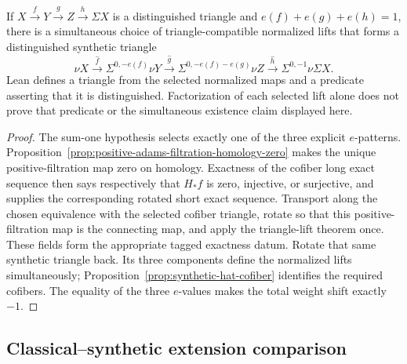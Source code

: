 \begin{proposition}
  \label{prop:normalized-synthetic-triangle}
  \notready
  If $X\xrightarrow fY\xrightarrow gZ\xrightarrow h\Sigma X$ is a
  distinguished triangle and $e(f)+e(g)+e(h)=1$, there is a simultaneous
  choice of triangle-compatible normalized lifts that forms a distinguished
  synthetic triangle
  \[
    \nu X\xrightarrow{\widehat f}\Sigma^{0,-e(f)}\nu Y
    \xrightarrow{\widehat g}\Sigma^{0,-e(f)-e(g)}\nu Z
    \xrightarrow{\widehat h}\Sigma^{0,-1}\nu\Sigma X.
  \]
  Lean defines a triangle from the selected normalized maps and a
  predicate asserting that it is distinguished. Factorization of each
  selected lift alone does not prove that predicate or the simultaneous
  existence claim displayed here.
\end{proposition}

\begin{proof}
  The sum-one hypothesis selects exactly one of the three explicit
  $e$-patterns.  Proposition~\ref{prop:positive-adams-filtration-homology-zero}
  makes the unique positive-filtration map zero on homology.  Exactness of the
  cofiber long exact sequence then says respectively that $H_*f$ is zero,
  injective, or surjective, and supplies the corresponding rotated short exact
  sequence.  Transport along the chosen equivalence with the selected cofiber
  triangle, rotate so that this positive-filtration map is the connecting map,
  and apply the triangle-lift theorem once.  These fields form the appropriate
  tagged exactness datum.  Rotate that same synthetic triangle back.  Its three components define the normalized lifts
  simultaneously; Proposition~\ref{prop:synthetic-hat-cofiber} identifies the
  required cofibers.  The equality of the three $e$-values makes the total
  weight shift exactly $-1$.
\end{proof}

\subsection{Classical--synthetic extension comparison}

